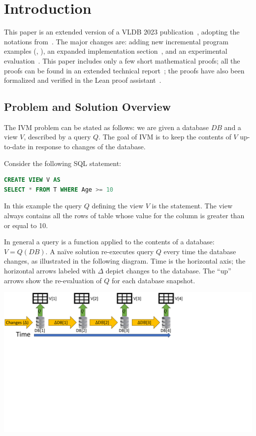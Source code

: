 \section{Introduction}\label{sec:introduction}

This paper is an extended version of a VLDB 2023
publication~\cite{budiu-vldb23}, adopting the notations
from~\cite{budiu-sigmod24}.  The major changes are: adding new
incremental program examples (,
), an expanded
implementation section~, and an
experimental evaluation~.  This paper includes
only a few short mathematical proofs; all the proofs can be found in
an extended technical report~\cite{tr}; the proofs have also been
formalized and verified in the Lean proof
assistant~\cite{dbsp-theory}.

\subsection{Problem and Solution Overview}\label{sec:intro-incremental}

The IVM problem can be stated as follows: we are given a database $DB$
and a view $V$, described by a query $Q$.  The goal of IVM is to keep
the contents of $V$ up-to-date in response to changes of the database.

Consider the following SQL statement:

\begin{lstlisting}[language=SQL]
CREATE VIEW V AS
SELECT * FROM T WHERE Age >= 10
\end{lstlisting}

In this example the query $Q$ defining the view $V$ is the
 statement.  The view  always contains all the
rows of table  whose value for the column  is
greater than or equal to 10.

In general a query is a function applied to the contents of a
database: $V = Q(DB)$.  A na\"ive solution re-executes query $Q$ every
time the database changes, as illustrated in the following diagram.
Time is the horizontal axis; the horizontal arrows labeled with
$\Delta$ depict changes to the database.  The ``up'' arrows show the
re-evaluation of $Q$ for each database snapshot.

\noindent \includegraphics[trim={0 4.8in 3.7in 0},clip,scale=.34]{view.pdf}


